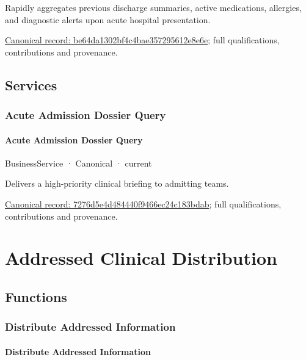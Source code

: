 Rapidly aggregates previous discharge summaries, active medications, allergies, and diagnostic alerts upon acute hospital presentation.


{\footnotesize \href{../../../../continuum/business/business-function/be64da1302bf4c4bae357295612e8e6e.md}{Canonical record: be64da1302bf4c4bae357295612e8e6e}; full qualifications, contributions and provenance.}\par
\subsection{Services}

\subsubsection{Acute Admission Dossier Query}

\paragraph{Acute Admission Dossier Query}

\label{element:7276d5e4d484440f9466ec24c183bdab}
{\small BusinessService · Canonical · current}\par

Delivers a high-priority clinical briefing to admitting teams.


{\footnotesize \href{../../../../continuum/business/business-service/7276d5e4d484440f9466ec24c183bdab.md}{Canonical record: 7276d5e4d484440f9466ec24c183bdab}; full qualifications, contributions and provenance.}\par
\section{Addressed Clinical Distribution}

\subsection{Functions}

\subsubsection{Distribute Addressed Information}

\paragraph{Distribute Addressed Information}

